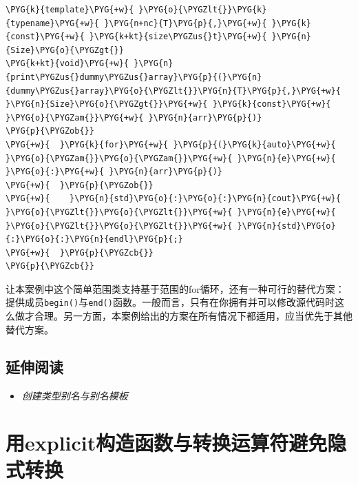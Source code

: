 \begin{codeblockbg}
\begin{Verbatim}[commandchars=\\\{\},breaklines=true,breakanywhere=true,fontsize=\codefont,xleftmargin=17bp]
\PYG{k}{template}\PYG{+w}{ }\PYG{o}{\PYGZlt{}}\PYG{k}{typename}\PYG{+w}{ }\PYG{n+nc}{T}\PYG{p}{,}\PYG{+w}{ }\PYG{k}{const}\PYG{+w}{ }\PYG{k+kt}{size\PYGZus{}t}\PYG{+w}{ }\PYG{n}{Size}\PYG{o}{\PYGZgt{}}
\PYG{k+kt}{void}\PYG{+w}{ }\PYG{n}{print\PYGZus{}dummy\PYGZus{}array}\PYG{p}{(}\PYG{n}{dummy\PYGZus{}array}\PYG{o}{\PYGZlt{}}\PYG{n}{T}\PYG{p}{,}\PYG{+w}{ }\PYG{n}{Size}\PYG{o}{\PYGZgt{}}\PYG{+w}{ }\PYG{k}{const}\PYG{+w}{ }\PYG{o}{\PYGZam{}}\PYG{+w}{ }\PYG{n}{arr}\PYG{p}{)}
\PYG{p}{\PYGZob{}}
\PYG{+w}{  }\PYG{k}{for}\PYG{+w}{ }\PYG{p}{(}\PYG{k}{auto}\PYG{+w}{ }\PYG{o}{\PYGZam{}}\PYG{o}{\PYGZam{}}\PYG{+w}{ }\PYG{n}{e}\PYG{+w}{ }\PYG{o}{:}\PYG{+w}{ }\PYG{n}{arr}\PYG{p}{)}
\PYG{+w}{  }\PYG{p}{\PYGZob{}}
\PYG{+w}{    }\PYG{n}{std}\PYG{o}{:}\PYG{o}{:}\PYG{n}{cout}\PYG{+w}{ }\PYG{o}{\PYGZlt{}}\PYG{o}{\PYGZlt{}}\PYG{+w}{ }\PYG{n}{e}\PYG{+w}{ }\PYG{o}{\PYGZlt{}}\PYG{o}{\PYGZlt{}}\PYG{+w}{ }\PYG{n}{std}\PYG{o}{:}\PYG{o}{:}\PYG{n}{endl}\PYG{p}{;}
\PYG{+w}{  }\PYG{p}{\PYGZcb{}}
\PYG{p}{\PYGZcb{}}
\end{Verbatim}
\end{codeblockbg}



让本案例中这个简单范围类支持基于范围的for循环，还有一种可行的替代方案：提供成员\texttt{begin()}与\texttt{end()}函数。一般而言，只有在你拥有并可以修改源代码时这么做才合理。另一方面，本案例给出的方案在所有情况下都适用，应当优先于其他替代方案。



\subsection{延伸阅读}



\begin{itemize}
\item \textit{创建类型别名与别名模板}

\end{itemize}



\section{用explicit构造函数与转换运算符避免隐式转换}


